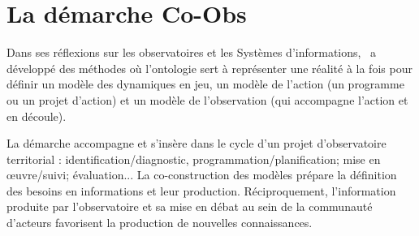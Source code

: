 \section[coobs]{La démarche Co-Obs}

\startplacefigure[location=middle,title={La démarche Co-Obs}]
\stopplacefigure

Dans ses réflexions sur les observatoires et les Systèmes d'informations,
\TETIS\ a développé des méthodes où l'ontologie sert à représenter une réalité
à la fois pour définir un modèle des dynamiques en jeu,
un modèle de l'action (un programme ou un projet d'action)
et un modèle de l'observation (qui accompagne l'action et en découle). 

La démarche accompagne et s'insère dans le cycle d'un projet d'observatoire territorial :
identification/diagnostic, programmation/planification; mise en œuvre/suivi; évaluation... 
La co-construction des modèles prépare la définition des besoins en informations et leur production.
Réciproquement, l’information produite par l’observatoire et sa mise en débat au sein de la communauté 
d’acteurs favorisent la production de nouvelles connaissances.